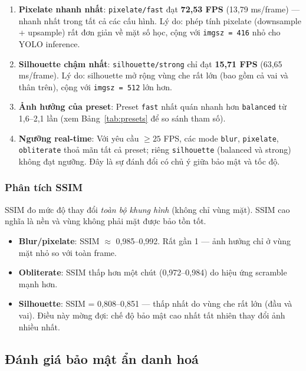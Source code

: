 \begin{enumerate}[1.]
    \item \textbf{Pixelate nhanh nhất}: \texttt{pixelate/fast} đạt \textbf{72,53 FPS} (13,79 ms/frame) --- nhanh nhất trong tất cả các cấu hình. Lý do: phép tính pixelate (downsample + upsample) rất đơn giản về mặt số học, cộng với \texttt{imgsz = 416} nhỏ cho YOLO inference.
    
    \item \textbf{Silhouette chậm nhất}: \texttt{silhouette/strong} chỉ đạt \textbf{15,71 FPS} (63,65 ms/frame). Lý do: silhouette mở rộng vùng che rất lớn (bao gồm cả vai và thân trên), cộng với \texttt{imgsz = 512} lớn hơn.
    
    \item \textbf{Ảnh hưởng của preset}: Preset \texttt{fast} nhất quán nhanh hơn \texttt{balanced} từ 1,6--2,1 lần (xem Bảng~\ref{tab:presets} để so sánh tham số).
    
    \item \textbf{Ngưỡng real-time}: Với yêu cầu $\geq 25$ FPS, các mode \texttt{blur}, \texttt{pixelate}, \texttt{obliterate} thoả mãn tất cả preset; riêng \texttt{silhouette} (balanced và strong) không đạt ngưỡng. Đây là sự đánh đổi có chủ ý giữa bảo mật và tốc độ.
\end{enumerate}

\subsubsection{Phân tích SSIM}

SSIM đo mức độ thay đổi \textit{toàn bộ khung hình} (không chỉ vùng mặt). SSIM cao nghĩa là nền và vùng không phải mặt được bảo tồn tốt.

\begin{itemize}
    \item \textbf{Blur/pixelate}: SSIM $\approx$ 0,985--0,992. Rất gần 1 --- ảnh hưởng chỉ ở vùng mặt nhỏ so với toàn frame.
    \item \textbf{Obliterate}: SSIM thấp hơn một chút (0,972--0,984) do hiệu ứng scramble mạnh hơn.
    \item \textbf{Silhouette}: SSIM = 0,808--0,851 --- thấp nhất do vùng che rất lớn (đầu và vai). Điều này mờng đợi: chế độ bảo mật cao nhất tất nhiên thay đổi ảnh nhiều nhất.
\end{itemize}

\subsection{Đánh giá bảo mật ẩn danh hoá}
\label{subsec:security}

